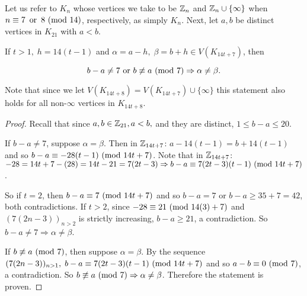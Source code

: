 \begin{thm}\label{safemapping}
    Let us refer to $K_{n}$ whose vertices we take to be $\mathbb{Z}_{n}$ and $\mathbb{Z}_{n}\cup \{\infty\}$ when $n\equiv 7\,\text{ or }\,8\ (\mathrm{mod}\ 14)$, respectively, as simply $K_{n}$. Next, let $a,b$ be distinct vertices in $K_{21}$ with $a<b$. 
    
    If $t>1,\;h = 14(t-1)$ and $\alpha = a-h,\;\beta  = b+h\in V(K_{14t+7})$, then

        $$b-a\neq 7\text{ or }b\not\equiv a\ (\mathrm{mod}\ 7)\Rightarrow \alpha\neq \beta.$$

    Note that since we let $V(K_{14t+8})=V(K_{14t+7})\cup \{\infty\}$ this statement also holds for all non-$\infty$ vertices in $K_{14t+8}$.

    \begin{proof} Recall that since $a,b\in \mathbb{Z}_{21},a<b,$ and they are distinct, $1\leq b-a\leq 20$.
    
    If $b-a\neq 7$, suppose $\alpha=\beta$. Then in $\mathbb{Z}_{14t+7}$: $a-14(t-1)=b+14(t-1)$ and so $b-a\equiv -28(t-1)\ (\mathrm{mod}\ 14t+7)$. Note that in $\mathbb{Z}_{14t+7}$: $-28=14t+7-(28)=14t-21=7(2t-3)\Rightarrow b-a\equiv 7(2t-3)(t-1)\ (\mathrm{mod}\ 14t+7)$.
    
    So if $t=2$, then $b-a \equiv 7\ (\mathrm{mod}\ 14t+7)$ and so $b-a=7$ or $b-a\geq 35+7=42$, both contradictions. If $t>2$, since $-28\equiv 21\ (\mathrm{mod}\ 14(3)+7)$ and $(7(2n-3))_{n>2}$ is strictly increasing, $b-a\geq 21$, a contradiction. So $b-a\neq 7\Rightarrow \alpha\neq \beta$.

    If $b\not\equiv a\ (\mathrm{mod}\ 7)$, then suppose $\alpha=\beta$. By the sequence $(7(2n-3))_{n>1},\;b-a\equiv  7(2t-3)(t-1)\ (\mathrm{mod}\ 14t+7)$ and so $a-b\equiv 0\ (\mathrm{mod}\ 7)$, a contradiction. So $b\not\equiv a\ (\mathrm{mod}\ 7)\Rightarrow \alpha\neq \beta$. Therefore the statement is proven.
    \end{proof}
\end{thm}


